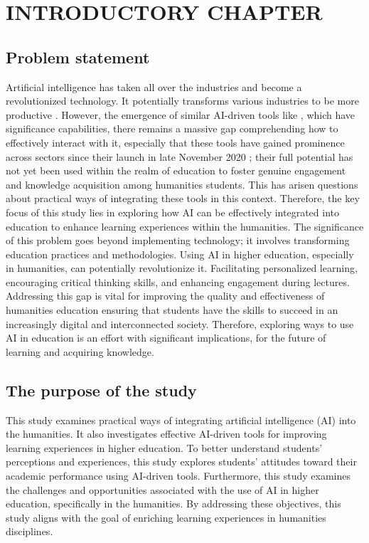 \chapter{INTRODUCTORY CHAPTER}\label{ch:introductory-chapter}
\section{Problem statement}\label{sec:problem-statement}
\justifying
Artificial intelligence has taken all over the industries and become a revolutionized technology.
It potentially transforms various industries to be more productive \citep{Dirk_Czarnitzki}.
However, the emergence of similar AI-driven tools like , which have significance
capabilities, there remains a massive gap comprehending how to effectively
interact with it,
especially that these tools have gained prominence across
sectors since their launch in late November 2020 \citet{MarrB_2023}; their full potential
has not yet been used within the realm of education to foster genuine
engagement and knowledge acquisition among humanities students.
This has arisen questions about practical ways of integrating these tools in this context.
Therefore, the key focus of this study lies in exploring how AI can be effectively integrated into education
to enhance learning experiences within the humanities.
The significance of this problem goes beyond implementing technology;
it involves transforming education practices and methodologies.
Using AI in higher education, especially in humanities, can potentially
revolutionize it.
Facilitating personalized learning, encouraging critical thinking skills, and
enhancing engagement during lectures.
Addressing this gap is vital for improving the quality and effectiveness of humanities education ensuring
that students have the skills to succeed in an increasingly digital and interconnected society.
Therefore, exploring ways to use AI in education is an effort with significant implications,
for the future of learning and acquiring knowledge.
\section{The purpose of the study}\label{sec:the-purpose-of-the-study}
\justifying
This study examines practical ways of integrating artificial intelligence (AI) into the humanities.
It also investigates effective AI-driven tools for improving learning experiences in higher education.
To better understand students’ perceptions and experiences, this study explores students’ attitudes toward their academic performance using AI-driven tools.
Furthermore, this study examines the challenges and opportunities associated with the use of AI in higher education, specifically in the humanities.
By addressing these objectives, this study aligns with the goal of enriching learning experiences in humanities disciplines.

